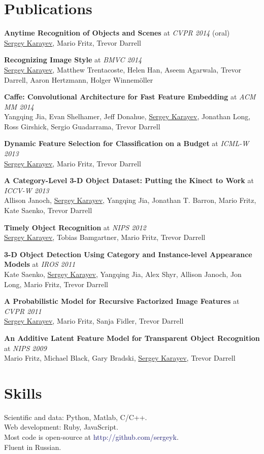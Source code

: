 \documentclass[line, margin]{res}
\begin{document}
\begin{resume}
\section{\sc Publications}

\textbf{Anytime Recognition of Objects and Scenes} at \emph{CVPR 2014} (oral)\\
\underline{Sergey Karayev}, Mario Fritz, Trevor Darrell

\textbf{Recognizing Image Style} at \emph{BMVC 2014}\\
\underline{Sergey Karayev}, Matthew Trentacoste, Helen Han, Aseem Agarwala, Trevor Darrell, Aaron Hertzmann, Holger Winnem\"{o}ller

\textbf{Caffe: Convolutional Architecture for Fast Feature Embedding} at \emph{ACM MM 2014}\\
Yangqing Jia, Evan Shelhamer, Jeff Donahue, \underline{Sergey Karayev},
Jonathan Long, Ross Girshick, Sergio Guadarrama, Trevor Darrell

\textbf{Dynamic Feature Selection for Classification on a Budget} at \emph{ICML-W 2013}\\
\underline{Sergey Karayev}, Mario Fritz, Trevor Darrell

\textbf{A Category-Level 3-D Object Dataset: Putting the Kinect to Work} at \emph{ICCV-W 2013}\\
Allison Janoch, \underline{Sergey Karayev}, Yangqing Jia, Jonathan T. Barron, Mario Fritz, Kate Saenko, Trevor Darrell

\textbf{Timely Object Recognition} at \emph{NIPS 2012}\\
\underline{Sergey Karayev}, Tobias Bamgartner, Mario Fritz, Trevor Darrell

\textbf{3-D Object Detection Using Category and Instance-level Appearance Models} at \emph{IROS 2011}\\
Kate Saenko, \underline{Sergey Karayev}, Yangqing Jia, Alex Shyr, Allison Janoch, Jon Long, Mario Fritz, Trevor Darrell

\textbf{A Probabilistic Model for Recursive Factorized Image Features} at \emph{CVPR 2011}\\
\underline{Sergey Karayev}, Mario Fritz, Sanja Fidler, Trevor Darrell

\textbf{An Additive Latent Feature Model for Transparent Object Recognition} at \emph{NIPS 2009}\\
Mario Fritz, Michael Black, Gary Bradski, \underline{Sergey Karayev}, Trevor Darrell

\section{\sc Skills}
Scientific and data: Python, Matlab, C/C++.\\
Web development: Ruby, JavaScript.\\
Most code is open-source at \textcolor{MidnightBlue}{http://github.com/sergeyk}.\\
Fluent in Russian.


\end{resume}
\end{document}
